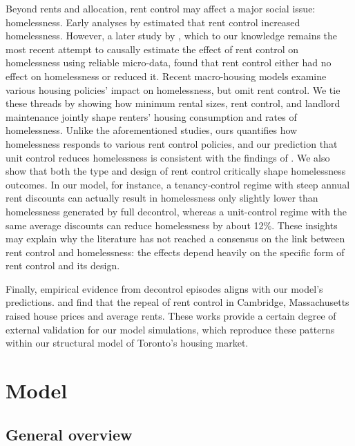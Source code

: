 \documentclass[parskip=full]{article}
\begin{document}
Beyond rents and allocation, rent control may affect a major social issue: homelessness. Early analyses by \citet{tucker1987,tucker1989heritage,tucker1991cato,tucker1991public} estimated that rent control increased homelessness. However, a later study by \citet{eo-1998}, which to our knowledge remains the most recent attempt to causally estimate the effect of rent control on homelessness using reliable micro-data, found that rent control either had no effect on homelessness or reduced it. Recent macro-housing models \citep{az-2024,abramson-2024} examine various housing policies' impact on homelessness, but omit rent control. We tie these threads by showing how minimum rental sizes, rent control, and landlord maintenance jointly shape renters’ housing consumption and rates of homelessness. Unlike the aforementioned studies, ours quantifies how homelessness responds to various rent control policies, and our prediction that unit control reduces homelessness is consistent with the findings of \citet{eo-1998}. We also show that both the type and design of rent control critically shape homelessness outcomes. In our model, for instance, a tenancy‑control regime with steep annual rent discounts can actually result in homelessness only slightly lower than homelessness generated by full decontrol, whereas a unit-control regime with the same average discounts can reduce homelessness by about 12\%. These insights may explain why the literature has not reached a consensus on the link between rent control and homelessness: the effects depend heavily on the specific form of rent control and its design.

Finally, empirical evidence from decontrol episodes aligns with our model’s predictions. \citet{sims-2007} and \citet{app-2014} find that the repeal of rent control in Cambridge, Massachusetts raised house prices and average rents. These works provide a certain degree of external validation for our model simulations, which reproduce these patterns within our structural model of Toronto’s housing market.

\section{Model}\label{sec:model}

\subsection{General overview}\label{sec:brief_overview}
\end{document}
